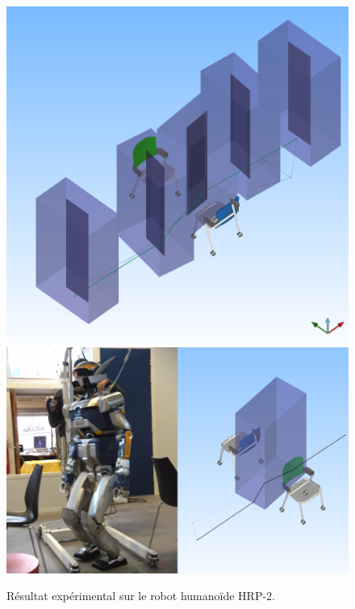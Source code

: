 \begin{figure}[htbp]
  \begin{center}
    \includegraphics[width=\linewidth]{src/chap1-roboptim/two-chairs.png}
    \includegraphics[width=\linewidth]{src/chap1-roboptim/hrp2-two-chairs.png}
  \end{center}
 \caption{Résultat expérimental sur le robot humanoïde
   HRP-2. \label{fig:results}}
\end{figure}

